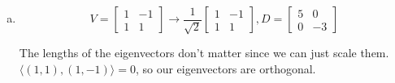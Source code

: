 \documentclass[12pt]{article}
\begin{document}
\section{} %
\begin{enumerate}[(a)]
	\item 
		\[V = \begin{bmatrix}
			1 & -1\\
			1 & 1
		\end{bmatrix} \rightarrow 
		\dfrac{1}{\sqrt{2}}
		\begin{bmatrix}
			1 & -1\\
			1 & 1
		\end{bmatrix}
		, D = \begin{bmatrix}
			5 & 0\\
			0 & -3
		\end{bmatrix}\]
		
		The lengths of the eigenvectors don't matter since we can just scale them. $ \langle (1,1), (1,-1) \rangle =0 $, so our eigenvectors are orthogonal.
	

\end{enumerate}
\end{document}
